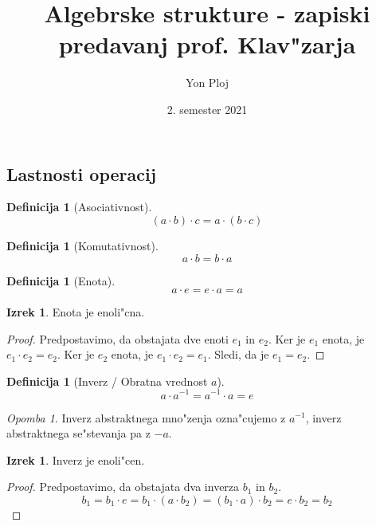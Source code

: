 \documentclass[11pt, a4paper]{article}
\theoremstyle{definition}
\newtheorem{defn}[counter]{Definicija}
\newtheorem{theorem}[counter]{Izrek}
\theoremstyle{remark}
\newtheorem*{rem}{Opomba}
\begin{document}
	
	\title{Algebrske strukture - zapiski predavanj prof. Klav"zarja}
	\author{Yon Ploj}
	\date{2. semester 2021}
	\maketitle
	
	\tableofcontents
	\vspace{2cm}

	\subsection{Lastnosti operacij}
	\begin{defn}[Asociativnost]
		\[ (a \cdot b) \cdot c = a \cdot (b \cdot c) \]
	\end{defn}
	\begin{defn}[Komutativnost]
		\[ a \cdot b = b \cdot a \]
	\end{defn}
	\begin{defn}[Enota]
		\[ a \cdot e = e \cdot a = a \]
	\end{defn}
	\begin{theorem}
		Enota je enoli"cna.
	\end{theorem}
	\begin{proof}
		Predpostavimo, da obstajata dve enoti $e_1$ in $e_2$.
		Ker je $e_1$ enota, je $e_1 \cdot e_2 = e_2$.
		Ker je $e_2$ enota, je $e_1 \cdot e_2 = e_1$.
		Sledi, da je $e_1 = e_2$.
	\end{proof}

	\begin{defn}[Inverz / Obratna vrednost $a$]
		\[ a \cdot a^{-1} = a^{-1} \cdot a = e \]
	\end{defn}
	\begin{rem}
		Inverz abstraktnega mno"zenja ozna"cujemo z $a^{-1}$, inverz abstraktnega se"stevanja pa z $-a$.
	\end{rem}
	\begin{theorem}
		Inverz je enoli"cen.
	\end{theorem}
	\begin{proof}
		Predpostavimo, da obstajata dva inverza $b_1$ in $b_2$.
		\[ b_1 = b_1 \cdot e = b_1 \cdot (a \cdot b_2) = (b_1 \cdot a) \cdot b_2 = e \cdot b_2 = b_2 \]
	\end{proof}
\end{document}
